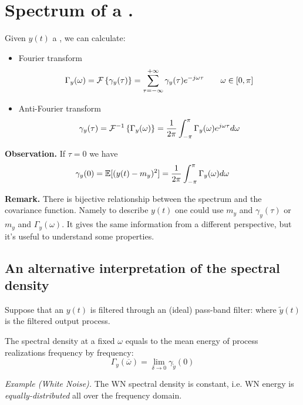 \section{Spectrum of a \ssp.}
Given $y(t)$ a \ssp, we can calculate:
\begin{itemize}
	\item Fourier transform
	\[
		\Gamma _{y}(\omega)=\mathcal{F}\left\{\gamma _{y}(\tau )\right\}=\sum_{\tau =-\infty }^{+\infty} \gamma _{y}(\tau ) e^{-j\omega \tau } \qquad \omega \in [0,\pi ]
	\]
	\item Anti-Fourier transform
	\[
		\gamma _{y}(\tau)=\mathcal{F}^{-1}\left\{\Gamma _{y}(\omega)\right\}=\frac{1}{2\pi }\int_{-\pi }^{\pi } \Gamma _{y}(\omega )e^{j\omega \tau }d\omega  
	\]
\end{itemize}

\textbf{Observation.}
If $\tau =0$ we have
\[
	\gamma _{y}(0)=\mathbb{E}[(y(t)-m_{y})^2 ]=\frac{1}{2\pi }\int_{-\pi }^{\pi } \Gamma _{y}(\omega )d\omega 
\]

\textbf{Remark.}
There is bijective relationship between the spectrum and the covariance function. Namely to describe $y(t)$ one could use $m_{y}$ and $\gamma _{y}(\tau )$ or $m_{y}$ and $\Gamma _{y}(\omega)$. It gives the same information from a different perspective, but it's useful to understand some properties.

\subsection{An alternative interpretation of the spectral density}
Suppose that an \ssp $y(t)$ is filtered through an (ideal) pass-band filter:
where $\tilde{y}(t)$ is the filtered output process.
\begin{theorem}
	The spectral density at a fixed $\omega$ equals to the mean energy of process realizations frequency by frequency:
	\[
		\Gamma _{y}(\overline{\omega})=\lim_{\delta  \to 0} \gamma _{\tilde{y}}(0)
	\]
\end{theorem}

\emph{Example (White Noise).}
The WN spectral density is constant, i.e. WN energy is \emph{equally-distributed} all over the frequency domain.

